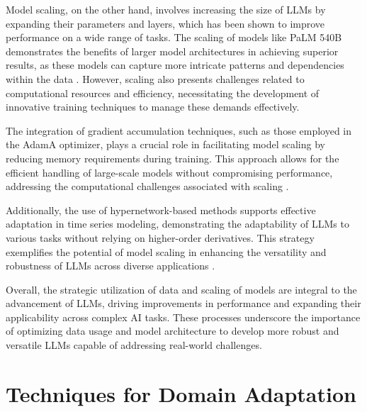 Model scaling, on the other hand, involves increasing the size of LLMs by expanding their parameters and layers, which has been shown to improve performance on a wide range of tasks. The scaling of models like PaLM 540B demonstrates the benefits of larger model architectures in achieving superior results, as these models can capture more intricate patterns and dependencies within the data \cite{chowdhery2023palm}. However, scaling also presents challenges related to computational resources and efficiency, necessitating the development of innovative training techniques to manage these demands effectively.



The integration of gradient accumulation techniques, such as those employed in the AdamA optimizer, plays a crucial role in facilitating model scaling by reducing memory requirements during training. This approach allows for the efficient handling of large-scale models without compromising performance, addressing the computational challenges associated with scaling \cite{zhang2023adamaccumulationreducememory}.



Additionally, the use of hypernetwork-based methods supports effective adaptation in time series modeling, demonstrating the adaptability of LLMs to various tasks without relying on higher-order derivatives. This strategy exemplifies the potential of model scaling in enhancing the versatility and robustness of LLMs across diverse applications \cite{stank2024designingtimeseriesmodelshypernetworks}.



Overall, the strategic utilization of data and scaling of models are integral to the advancement of LLMs, driving improvements in performance and expanding their applicability across complex AI tasks. These processes underscore the importance of optimizing data usage and model architecture to develop more robust and versatile LLMs capable of addressing real-world challenges.












\section{Techniques for Domain Adaptation} \label{sec:Techniques for Domain Adaptation}



